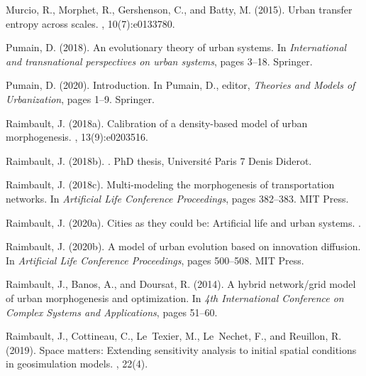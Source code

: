 \documentclass[letterpaper]{article}
\begin{document}
\begin{thebibliography}{}
Murcio, R., Morphet, R., Gershenson, C., and Batty, M. (2015).
\newblock Urban transfer entropy across scales.
, 10(7):e0133780.

Pumain, D. (2018).
\newblock An evolutionary theory of urban systems.
\newblock In {\em International and transnational perspectives on urban
  systems}, pages 3--18. Springer.

Pumain, D. (2020).
\newblock Introduction.
\newblock In Pumain, D., editor, {\em Theories and Models of Urbanization},
  pages 1--9. Springer.

Raimbault, J. (2018a).
\newblock Calibration of a density-based model of urban morphogenesis.
, 13(9):e0203516.

Raimbault, J. (2018b).
.
\newblock PhD thesis, Universit{\'e} Paris 7 Denis Diderot.

Raimbault, J. (2018c).
\newblock Multi-modeling the morphogenesis of transportation networks.
\newblock In {\em Artificial Life Conference Proceedings}, pages 382--383. MIT
  Press.

Raimbault, J. (2020a).
\newblock Cities as they could be: Artificial life and urban systems.
.

Raimbault, J. (2020b).
\newblock A model of urban evolution based on innovation diffusion.
\newblock In {\em Artificial Life Conference Proceedings}, pages 500--508. MIT
  Press.

Raimbault, J., Banos, A., and Doursat, R. (2014).
\newblock A hybrid network/grid model of urban morphogenesis and optimization.
\newblock In {\em 4th International Conference on Complex Systems and
  Applications}, pages 51--60.

Raimbault, J., Cottineau, C., Le~Texier, M., Le~Nechet, F., and Reuillon, R.
  (2019).
\newblock Space matters: Extending sensitivity analysis to initial spatial
  conditions in geosimulation models.
, 22(4).


\end{thebibliography}
\end{document}
